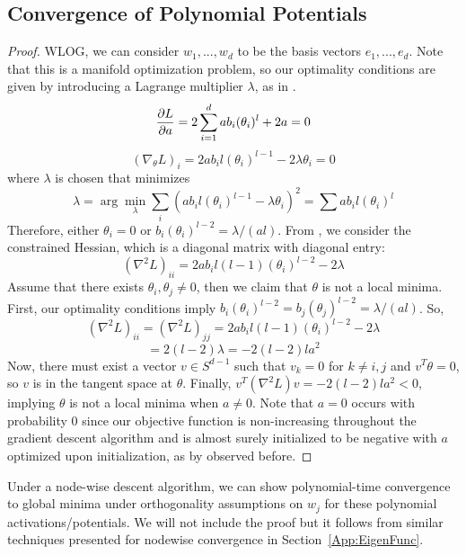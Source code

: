 
\subsection{Convergence of Polynomial Potentials}

\polystrict*

\begin{proof}
WLOG, we can consider $w_1,...,w_d$ to be the basis vectors $e_1,...,e_d$. Note that this is a manifold optimization problem, so our optimality conditions are given by introducing a Lagrange multiplier $\lambda$, as in \cite{GeHJY15}.
\[\frac{\partial L}{\partial a} = 2\sum_{i=1}^d ab_i (\theta_i)^l + 2a = 0\]
\[ (\nabla_\theta L)_i = 2ab_il(\theta_i)^{l-1}  -2\lambda \theta_i = 0 \]
where $\lambda$ is chosen that minimizes 
\[\lambda = \arg \min_\lambda \sum_i (ab_i l (\theta_i)^{l-1} - \lambda\theta_i)^2 = \sum ab_i l (\theta_i)^l \]
Therefore, either $\theta_i = 0$ or $b_i (\theta_i)^{l-2} = \lambda/(al)$. From \cite{GeHJY15}, we consider the constrained Hessian, which is a diagonal matrix with diagonal entry: 
\[(\nabla^2 L)_{ii} = 2a b_i l(l-1)(\theta_i)^{l-2} - 2 \lambda\]
Assume that there exists $\theta_i, \theta_j \neq 0$, then we claim that $\theta$ is not a local minima. First, our optimality conditions imply $b_i(\theta_i)^{l-2} = b_j (\theta_j)^{l-2} = \lambda/(al)$. So,
\[(\nabla^2 L)_{ii} = (\nabla^2L)_{jj} = 2a b_i l(l-1)(\theta_i)^{l-2} - 2 \lambda\]
\[ = 2(l-2)\lambda = -2(l-2)la^2\]
Now, there must exist a vector $v \in S^{d-1}$ such that $v_k = 0$ for $k \neq i,j$ and $v^T\theta = 0$, so $v$ is in the tangent space at $\theta$. Finally, $v^T(\nabla^2 L) v  = -2(l-2)l a^2 < 0$, implying $\theta$ is not a local minima when $a \neq 0$. Note that $a = 0$ occurs with probability 0 since our objective function is non-increasing throughout the gradient descent algorithm and is almost surely initialized to be negative with $a$ optimized upon initialization, as by observed before.
\end{proof}

Under a node-wise descent algorithm, we can show polynomial-time convergence to global minima under orthogonality assumptions on $w_j$ for these polynomial activations/potentials. We will not include the proof but it follows from similar techniques presented for nodewise convergence in Section~\ref{App:EigenFunc}.
%


